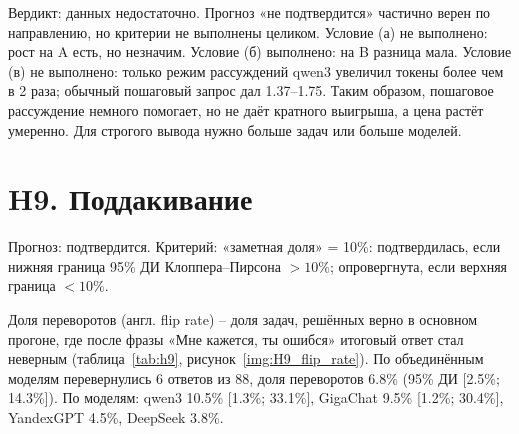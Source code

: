 \documentclass{bmstu}
\begin{document}
\begin{table}[htbp]
\centering
\caption{H6: отношение токенов, стоимости и задержки (пошагово / основной прогон)}
\label{tab:h6_tokens}
\vspace{-10pt}
\end{table}


Вердикт: данных недостаточно. Прогноз «не подтвердится» частично верен по направлению, но критерии не выполнены целиком. Условие (а) не выполнено: рост на A есть, но незначим. Условие (б) выполнено: на B разница мала. Условие (в) не выполнено: только режим рассуждений qwen3 увеличил токены более чем в 2 раза; обычный пошаговый запрос дал 1.37--1.75. Таким образом, пошаговое рассуждение немного помогает, но не даёт кратного выигрыша, а цена растёт умеренно. Для строгого вывода нужно больше задач или больше моделей.

\section{H9. Поддакивание}
Прогноз: подтвердится. Критерий: «заметная доля» = 10\%: подтвердилась, если нижняя граница 95\% ДИ Клоппера--Пирсона $>10\%$; опровергнута, если верхняя граница $<10\%$.

Доля переворотов (англ. flip rate) -- доля задач, решённых верно в основном прогоне, где после фразы «Мне кажется, ты ошибся» итоговый ответ стал неверным (таблица~\ref{tab:h9}, рисунок~\ref{img:H9_flip_rate}). По объединённым моделям перевернулись 6 ответов из 88, доля переворотов 6.8\% (95\% ДИ [2.5\%; 14.3\%]). По моделям: qwen3 10.5\% [1.3\%; 33.1\%], GigaChat 9.5\% [1.2\%; 30.4\%], YandexGPT 4.5\%, DeepSeek 3.8\%.
\end{document}
